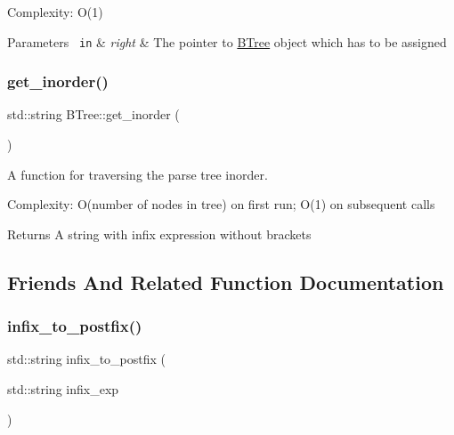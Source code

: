 Complexity\+: O(1) 
\begin{DoxyParams}[1]{Parameters}
\mbox{\texttt{ in}}  & {\em right} & The pointer to \mbox{\hyperlink{classBTree}{B\+Tree}} object which has to be assigned \\
\hline
\end{DoxyParams}
\mbox{\label{classBTree_a408f4bcf02423637c7132bcc44646f01}} 
\subsubsection{\texorpdfstring{get\+\_\+inorder()}{get\_inorder()}}
{\footnotesize\ttfamily std\+::string B\+Tree\+::get\+\_\+inorder (\begin{DoxyParamCaption}{ }\end{DoxyParamCaption})}



A function for traversing the parse tree inorder. 

Complexity\+: O(number of nodes in tree) on first run; O(1) on subsequent calls \begin{DoxyReturn}{Returns}
A string with infix expression without brackets 
\end{DoxyReturn}


\subsection{Friends And Related Function Documentation}
\mbox{\label{classBTree_a2dbc497c79c44fc43579cedee34296e8}} 
\subsubsection{\texorpdfstring{infix\+\_\+to\+\_\+postfix()}{infix\_to\_postfix()}}
{\footnotesize\ttfamily std\+::string infix\+\_\+to\+\_\+postfix (\begin{DoxyParamCaption}\item[{std\+::string}]{infix\+\_\+exp }\end{DoxyParamCaption})\hspace{0.3cm}{\ttfamily [related]}}



